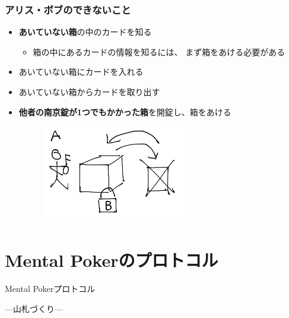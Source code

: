 \begin{frame}
  \frametitle{アリス・ボブのできないこと}

  \pause
  \begin{itemize}
    \item<+-> \textbf{あいていない箱}の中のカードを知る
    \begin{itemize}
      \item 箱の中にあるカードの情報を知るには、
      まず箱をあける必要がある
    \end{itemize}
   
    \item<+-> あいていない箱にカードを入れる
    \item<+-> あいていない箱からカードを取り出す
    
    \item<+-> \textbf{他者の南京錠が1つでもかかった箱}を開錠し、箱をあける
    \begin{figure}[h]
      \includegraphics[width=0.6\textwidth]{img/we_can_not.png}
    \end{figure}
  \end{itemize}
\end{frame}

\section{Mental Pokerのプロトコル}

\begin{frame}

  \centering
  {\huge Mental Pokerプロトコル}

  \vspace{1em}

  ---山札づくり---
\end{frame}

\setcounter{ProtocolIndex}{1}
\newcommand*{\showIndex}{\theProtocolIndex .\;}
\newcommand*{\showAndIncrement}{%
  \showIndex%
  \stepcounter{ProtocolIndex}%
}

